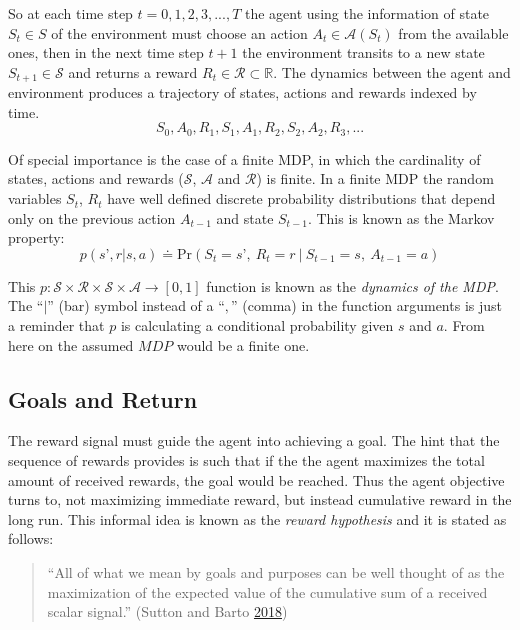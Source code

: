 \documentclass[
  openany]{book}
\begin{document}
So at each time step \(t=0,1,2,3,...,T\) the agent using the information of state \(S_t \in S\) of the environment must choose an action \(A_t \in \mathcal{A}(S_t)\) from the available ones, then in the next time step \(t+1\) the environment transits to a new state \(S_{t+1} \in \mathcal{S}\) and returns a reward \(R_t \in \mathcal{R} \subset \mathds{R}\). The dynamics between the agent and environment produces a trajectory of states, actions and rewards indexed by time.
\[ S_0, A_0, R_1, S_1, A_1, R_2, S_2, A_2, R_3, ...\]

Of special importance is the case of a finite MDP, in which the cardinality of states, actions and rewards (\(\mathcal{S}\), \(\mathcal{A}\) and \(\mathcal{R}\)) is finite. In a finite MDP the random variables \(S_t\), \(R_t\) have well defined discrete probability distributions that depend only on the previous action \(A_{t-1}\) and state \(S_{t-1}\). This is known as the Markov property:
\[ p(s’, r | s, a) \doteq \text{Pr}(S_t=s’,\ R_t=r\ |\ S_{t-1}=s,\ A_{t-1}=a) \]

This \(p: \mathcal{S} \times \mathcal{R} \times \mathcal{S} \times \mathcal{A} \rightarrow [0,1]\) function is known as the \emph{dynamics of the MDP}. The ``\(|\)'' (bar) symbol instead of a ``\(,\)'' (comma) in the function arguments is just a reminder that \(p\) is calculating a conditional probability given \(s\) and \(a\). From here on the assumed \(MDP\) would be a finite one.

\hypertarget{goals-and-return}{%
\subsection{Goals and Return}\label{goals-and-return}}

The reward signal must guide the agent into achieving a goal. The hint that the sequence of rewards provides is such that if the the agent maximizes the total amount of received rewards, the goal would be reached. Thus the agent objective turns to, not maximizing immediate reward, but instead cumulative reward in the long run. This informal idea is known as the \emph{reward hypothesis} and it is stated as follows:

\begin{quote}
``All of what we mean by goals and purposes can be well thought of as the maximization of the expected value of the cumulative sum of a received scalar signal.'' (Sutton and Barto \protect\hyperlink{ref-sutton2018reinforcement}{2018})
\end{quote}
\end{document}
